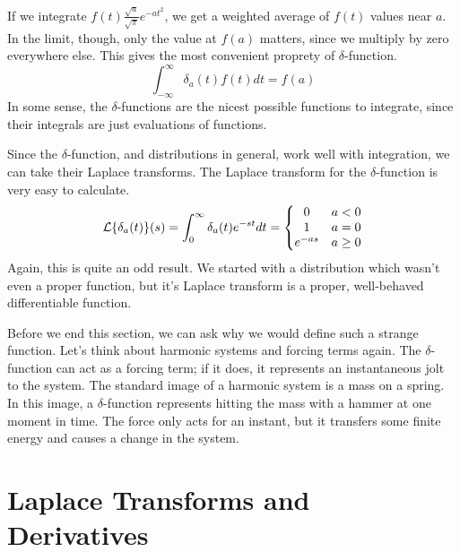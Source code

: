 \documentclass[fleqn,letterpaper]{report}
\begin{document}
If we integrate $f(t) \frac{\sqrt{a}}{\sqrt{\pi}} e^{-at^2}$,
we get a weighted average of $f(t)$ values near $a$. In the
limit, though, only the value at $f(a)$ matters, since we
multiply by zero everywhere else. This gives the most
convenient proprety of $\delta$-function.
\begin{equation*}
\int_{-\infty}^\infty \delta_a (t) f(t) dt = f(a)
\end{equation*}
In some sense, the $\delta$-functions are the nicest possible
functions to integrate, since their integrals are just
evaluations of functions. 

Since the $\delta$-function, and distributions in general,
work well with integration, we can take their Laplace
transforms. The Laplace transform for the $\delta$-function
is very easy to calculate.
\begin{equation*}
\mathcal{L} \{ \delta_a(t) \} (s) = \int_0^\infty \delta_a (t) e^{-st}
dt = \left\{ \begin{matrix} 
0 & a < 0 \\ 
1 & a = 0 \\ 
e^{-as} & a \geq 0 
\end{matrix} \right.
\end{equation*}
Again, this is quite an odd result. We started with a
distribution which wasn't even a proper function, but it's
Laplace transform is a proper, well-behaved differentiable
function.  

Before we end this section, we can ask why we would define
such a strange function. Let's think about harmonic systems
and forcing terms again. The $\delta$-function can act as a
forcing term; if it does, it represents an instantaneous jolt
to the system. The standard image of a harmonic system is a
mass on a spring. In this image, a $\delta$-function
represents hitting the mass with a hammer at one moment in
time. The force only acts for an instant, but it transfers
some finite energy and causes a change in the system.

\section{Laplace Transforms and Derivatives}
\label{derivatives}
\end{document}
